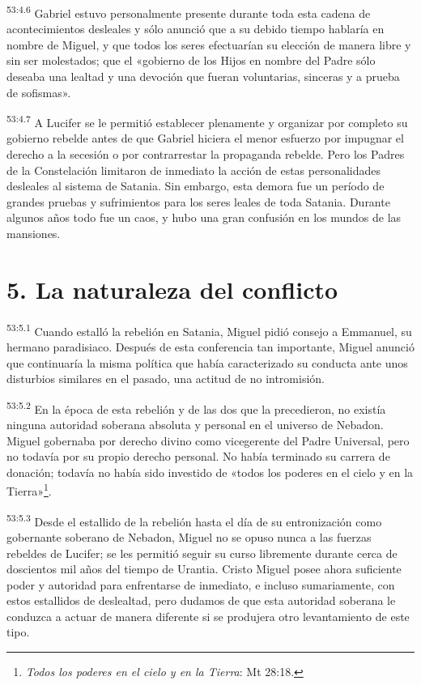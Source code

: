 \par
\textsuperscript{53:4.6} Gabriel estuvo personalmente presente durante toda esta cadena de acontecimientos desleales y sólo anunció que a su debido tiempo hablaría en nombre de Miguel, y que todos los seres efectuarían su elección de manera libre y sin ser molestados; que el «gobierno de los Hijos en nombre del Padre sólo deseaba una lealtad y una devoción que fueran voluntarias, sinceras y a prueba de sofismas».

\par
\textsuperscript{53:4.7} A Lucifer se le permitió establecer plenamente y organizar por completo su gobierno rebelde antes de que Gabriel hiciera el menor esfuerzo por impugnar el derecho a la secesión o por contrarrestar la propaganda rebelde. Pero los Padres de la Constelación limitaron de inmediato la acción de estas personalidades desleales al sistema de Satania. Sin embargo, esta demora fue un período de grandes pruebas y sufrimientos para los seres leales de toda Satania. Durante algunos años todo fue un caos, y hubo una gran confusión en los mundos de las mansiones.

\section*{5. La naturaleza del conflicto}
\par
\textsuperscript{53:5.1} Cuando estalló la rebelión en Satania, Miguel pidió consejo a Emmanuel, su hermano paradisiaco. Después de esta conferencia tan importante, Miguel anunció que continuaría la misma política que había caracterizado su conducta ante unos disturbios similares en el pasado, una actitud de no intromisión.

\par
\textsuperscript{53:5.2} En la época de esta rebelión y de las dos que la precedieron, no existía ninguna autoridad soberana absoluta y personal en el universo de Nebadon. Miguel gobernaba por derecho divino como vicegerente del Padre Universal, pero no todavía por su propio derecho personal. No había terminado su carrera de donación; todavía no había sido investido de «todos los poderes en el cielo y en la Tierra»\footnote{\textit{Todos los poderes en el cielo y en la Tierra}: Mt 28:18.}.

\par
\textsuperscript{53:5.3} Desde el estallido de la rebelión hasta el día de su entronización como gobernante soberano de Nebadon, Miguel no se opuso nunca a las fuerzas rebeldes de Lucifer; se les permitió seguir su curso libremente durante cerca de doscientos mil años del tiempo de Urantia. Cristo Miguel posee ahora suficiente poder y autoridad para enfrentarse de inmediato, e incluso sumariamente, con estos estallidos de deslealtad, pero dudamos de que esta autoridad soberana le conduzca a actuar de manera diferente si se produjera otro levantamiento de este tipo.

